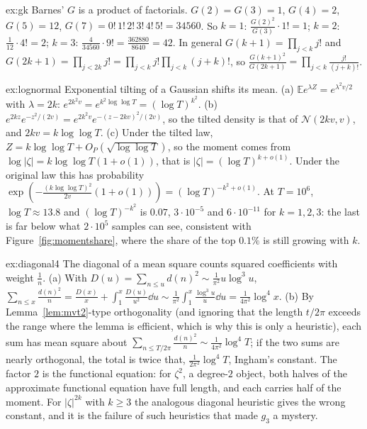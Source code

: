 \begin{solution}{ex:gk}
\idea Barnes' $G$ is a product of factorials.
\writeup $G(2)=G(3)=1$, $G(4)=2$, $G(5)=12$, $G(7)=0!\,1!\,2!\,3!\,4!\,5!=34560$. So $k=1$: $\frac{G(2)^2}{G(3)}\cdot1!=1$; $k=2$: $\frac1{12}\cdot4!=2$; $k=3$: $\frac4{34560}\cdot9!=\frac{362880}{8640}=42$. In general $G(k+1)=\prod_{j<k}j!$ and $G(2k+1)=\prod_{j<2k}j!=\prod_{j<k}j!\prod_{j<k}(j+k)!$, so $\frac{G(k+1)^2}{G(2k+1)}=\prod_{j<k}\frac{j!}{(j+k)!}$.
\end{solution}

\begin{solution}{ex:lognormal}
\idea Exponential tilting of a Gaussian shifts its mean.
\writeup (a) $\mathbb Ee^{\lambda Z}=e^{\lambda^2v/2}$ with $\lambda=2k$: $e^{2k^2v}=e^{k^2\log\log T}=(\log T)^{k^2}$. (b) $e^{2kz}e^{-z^2/(2v)}=e^{2k^2v}e^{-(z-2kv)^2/(2v)}$, so the tilted density is that of $\mathcal N(2kv,v)$, and $2kv=k\log\log T$. (c) Under the tilted law, $Z=k\log\log T+O_P(\sqrt{\log\log T})$, so the moment comes from $\log|\zeta|=k\log\log T(1+o(1))$, that is $|\zeta|=(\log T)^{k+o(1)}$. Under the original law this has probability $\exp(-\frac{(k\log\log T)^2}{2v}(1+o(1)))=(\log T)^{-k^2+o(1)}$. At $T=10^6$, $\log T\approx13.8$ and $(\log T)^{-k^2}$ is $0.07$, $3\cdot10^{-5}$ and $6\cdot10^{-11}$ for $k=1,2,3$: the last is far below what $2\cdot10^5$ samples can see, consistent with Figure~\ref{fig:momentshare}, where the share of the top $0.1\%$ is still growing with $k$.
\end{solution}

\begin{solution}{ex:diagonal4}
\idea The diagonal of a mean square counts squared coefficients with weight $\frac1n$.
\writeup (a) With $D(u)=\sum_{n\le u}d(n)^2\sim\frac1{\pi^2}u\log^3u$, $\sum_{n\le x}\frac{d(n)^2}n=\frac{D(x)}x+\int_1^x\frac{D(u)}{u^2}\dd u\sim\frac1{\pi^2}\int_1^x\frac{\log^3u}u\dd u=\frac1{4\pi^2}\log^4x$. (b) By Lemma~\ref{lem:mvt2}-type orthogonality (and ignoring that the length $t/2\pi$ exceeds the range where the lemma is efficient, which is why this is only a heuristic), each sum has mean square about $\sum_{n\le T/2\pi}\frac{d(n)^2}n\sim\frac1{4\pi^2}\log^4T$; if the two sums are nearly orthogonal, the total is twice that, $\frac1{2\pi^2}\log^4T$, Ingham's constant. The factor $2$ is the functional equation: for $\zeta^2$, a degree-$2$ object, both halves of the approximate functional equation have full length, and each carries half of the moment. For $|\zeta|^{2k}$ with $k\ge3$ the analogous diagonal heuristic gives the wrong constant, and it is the failure of such heuristics that made $g_3$ a mystery.
\end{solution}

